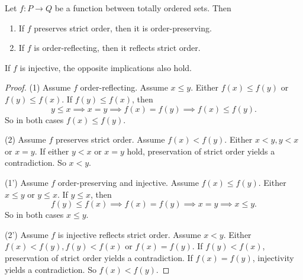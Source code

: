 \begin{lemma} \label{equivalenceOrderPreservingReflecting}
Let $f:P\to Q$ be a function between totally ordered sets. Then
\begin{enumerate}
\item If $f$ preserves strict order, then it is order-preserving.
\item If $f$ is order-reflecting, then it reflects strict order.
\end{enumerate}
If $f$ is injective, the opposite implications also hold.
\end{lemma}
\begin{proof}
(1) Assume $f$ order-reflecting. Assume $x\leq y$. Either $f(x)\leq f(y)$ or $f(y)\leq f(x)$. If $f(y)\leq f(x)$, then
\[ y\leq x \implies x=y \implies f(x)=f(y) \implies f(x)\leq f(y). \]
So in both cases $f(x)\leq f(y)$.

(2) Assume $f$ preserves strict order. Assume $f(x) < f(y)$. Either $x<y, y<x$ or $x=y$. If either $y<x$ or $x=y$ hold, preservation of strict order yields a contradiction. So $x<y$.

(1') Assume $f$ order-preserving and injective. Assume $f(x)\leq f(y)$. Either $x\leq y$ or $y\leq x$. If $y\leq x$, then
\[ f(y)\leq f(x) \implies f(x)=f(y) \implies x= y \implies x\leq y. \]
So in both cases $x\leq y$.

(2') Assume $f$ is injective reflects strict order. Assume $x < y$. Either $f(x)<f(y), f(y)<f(x)$ or $f(x)=f(y)$. If $f(y)<f(x)$, preservation of strict order yields a contradiction. If $f(x)=f(y)$, injectivity yields a contradiction. So $f(x)<f(y)$.
\end{proof}


